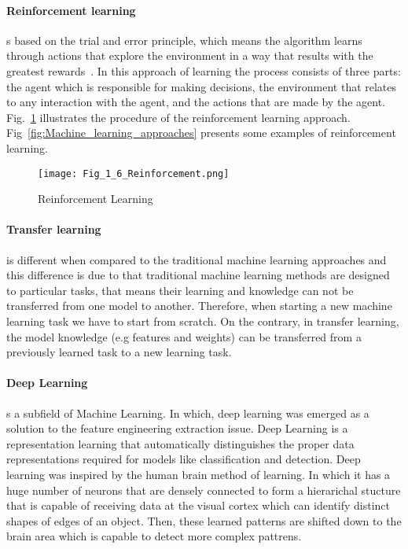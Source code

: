 \paragraph{Reinforcement learning}
s based on the trial and error principle, which means the algorithm learns through actions that explore the environment in a way that results with the greatest rewards~\cite{Russell2010}.
In this approach of learning the process consists of three parts: the agent which is responsible for making decisions, the environment that relates to any interaction with the agent, and the actions that are made by the agent. Fig.~\ref{fig:ReinforcementLearning} illustrates the procedure of the reinforcement learning approach.
Fig~\ref{fig:Machine_learning_approaches} presents some examples of reinforcement learning.

\begin{figure} [h!]
	\begin{center}
		\centering
	\texttt{[image: Fig\_1\_6\_Reinforcement.png]}
	\end{center}
	
\caption{Reinforcement Learning}
 
	\label{fig:ReinforcementLearning}
\end{figure}


\paragraph{Transfer learning}
is different when compared to the traditional machine learning approaches and this difference is due to that traditional machine learning methods are designed to particular tasks, that means their learning and knowledge can not be transferred from one model to another.
Therefore, when starting a new machine learning task we have to start from scratch.
On the contrary, in transfer learning, the model knowledge (e.g features and weights) can be transferred from a previously learned task to a new learning task.




\paragraph{Deep Learning}
s a subfield of Machine Learning.
In which, deep learning was emerged as a solution to the feature engineering extraction issue.
Deep Learning is a representation learning that automatically distinguishes  the proper data representations required for models like classification and detection.
Deep learning was inspired by the human brain method of learning. 
In which it has a huge number of neurons that are densely connected to form a hierarichal stucture that is capable of receiving data at the visual cortex which can identify distinct shapes of edges of an object.
Then, these learned patterns  are shifted down to the brain area which is capable to detect more complex pattrens. 
 
